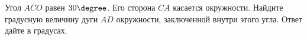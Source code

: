 \begin{ex}
	\begin{condition}
		 Угол \( ACO \) равен \( 30 \degree\). Его сторона \( CA \) касается окружности. Найдите градусную величину дуги \( AD \) окружности, заключенной внутри этого угла. Ответ дайте в градусах.
	\end{condition}
\end{ex}